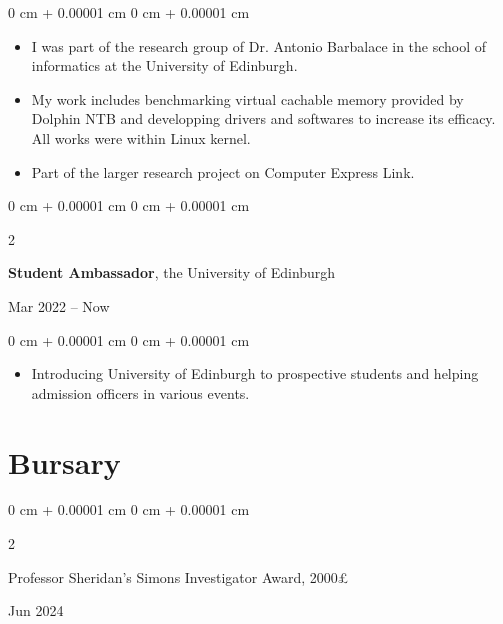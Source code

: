 \documentclass[10pt, letterpaper]{article}
\newenvironment{highlights}{
    \begin{itemize}[
        topsep=0.10 cm,
        parsep=0.10 cm,
        partopsep=0pt,
        itemsep=0pt,
        leftmargin=0 cm + 10pt
    ]
}{
    \end{itemize}
} %
\newenvironment{onecolentry}{
    \begin{adjustwidth}{
        0 cm + 0.00001 cm
    }{
        0 cm + 0.00001 cm
    }
}{
    \end{adjustwidth}
} %
\newenvironment{twocolentry}[2][]{
    \onecolentry
    \def\secondColumn{#2}
    \setcolumnwidth{\fill, 4.5 cm}
    \begin{paracol}{2}
}{
    \switchcolumn \raggedleft \secondColumn
    \end{paracol}
    \endonecolentry
} %
\begin{document}
        \vspace{0.10 cm}
        \begin{onecolentry}
            \begin{highlights}
                \item I was part of the research group of Dr. Antonio Barbalace in the school of informatics at the University of Edinburgh.
				\item My work includes benchmarking virtual cachable memory provided by Dolphin NTB and developping drivers and softwares to increase its efficacy.
				All works were within Linux kernel.
				\item Part of the larger research project on Computer Express Link.
            \end{highlights}
        \end{onecolentry}

        \vspace{0.2 cm}
        \begin{twocolentry}{
            Mar 2022 – Now
        }
            \textbf{Student Ambassador}, the University of Edinburgh
		\end{twocolentry}
        \vspace{0.10 cm}
        \begin{onecolentry}
            \begin{highlights}
				\item Introducing University of Edinburgh to prospective students and helping admission officers in various events.
            \end{highlights}
        \end{onecolentry}

    
    \section{Bursary}
        
        \begin{samepage}
            \begin{twocolentry}{
                Jun 2024
            }
                Professor Sheridan's Simons Investigator Award, 2000£
            \end{twocolentry}

        \end{samepage}
\end{document}

